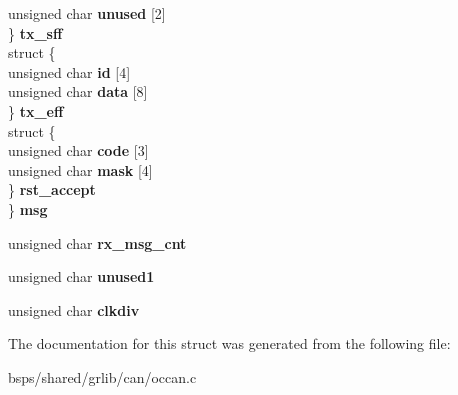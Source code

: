 \begin{DoxyCompactItemize}
\begin{tabbing}
\>\>unsigned char {\bfseries unused} \mbox{[}2\mbox{]}\\
\>\} {\bfseries tx\_sff}\\
\>struct \{\\
\>\>unsigned char {\bfseries id} \mbox{[}4\mbox{]}\\
\>\>unsigned char {\bfseries data} \mbox{[}8\mbox{]}\\
\>\} {\bfseries tx\_eff}\\
\>struct \{\\
\>\>unsigned char {\bfseries code} \mbox{[}3\mbox{]}\\
\>\>unsigned char {\bfseries mask} \mbox{[}4\mbox{]}\\
\>\} {\bfseries rst\_accept}\\
\} {\bfseries msg}\\

\end{tabbing}\item 
\mbox{\label{structpelican8__regs_a84bcf74440851332ee725ed71f44660d}} 
unsigned char {\bfseries rx\+\_\+msg\+\_\+cnt}
\item 
\mbox{\label{structpelican8__regs_af8e19e13e08825692fc637062f97e15c}} 
unsigned char {\bfseries unused1}
\item 
\mbox{\label{structpelican8__regs_a549648205c45998589efde589ad37558}} 
unsigned char {\bfseries clkdiv}
\end{DoxyCompactItemize}


The documentation for this struct was generated from the following file\+:\begin{DoxyCompactItemize}
\item 
bsps/shared/grlib/can/occan.\+c\end{DoxyCompactItemize}
